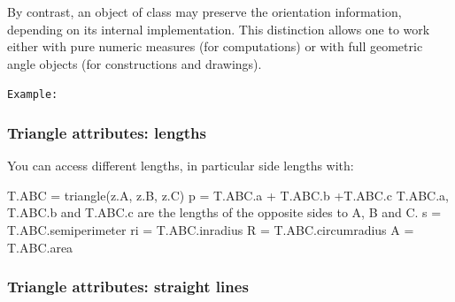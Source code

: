 By contrast, an object of class 
may preserve the orientation information,
depending on its internal implementation.
This distinction allows one to work either with
pure numeric measures (for computations)
or with full geometric angle objects
(for constructions and drawings).

\texttt{Example: }

\parindent =0pt
\begin{tkzexample}[latex=.5\textwidth]
\begin{center}
\end{center}
\end{tkzexample}

\subsubsection{Triangle attributes: lengths}
\label{ssub:triangle_attributes_lengths}

You can access different lengths, in particular side lengths with:
\begin{mybox}
\begin{tkzexample}
  T.ABC = triangle(z.A, z.B, z.C)
  p = T.ABC.a + T.ABC.b +T.ABC.c %
  T.ABC.a, T.ABC.b and T.ABC.c are the lengths of the opposite sides to A, B and C.
  s = T.ABC.semiperimeter
  ri = T.ABC.inradius
  R = T.ABC.circumradius
  A = T.ABC.area
\end{tkzexample}
\end{mybox}

\subsubsection{Triangle attributes: straight lines}
\label{ssub:triangle_attributes_straight_lines}

